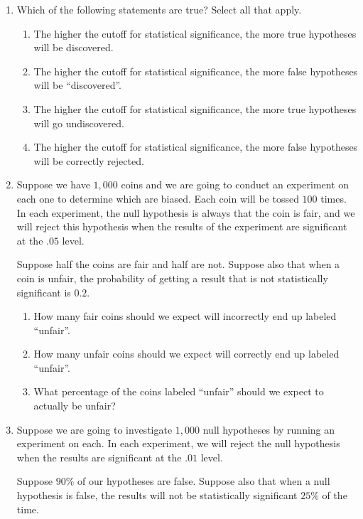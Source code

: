 \documentclass[justified]{tufte-book}
\providecommand{\tightlist}{%
  \setlength{\itemsep}{0pt}\setlength{\parskip}{0pt}}
\theoremstyle{definition}
\theoremstyle{definition}
\theoremstyle{definition}
\theoremstyle{remark}
\begin{document}
\begin{enumerate}
\item
  Which of the following statements are true? Select all that apply.

  \begin{enumerate}
  \def\labelenumii{\alph{enumii}.}
  \tightlist
  \item
    The higher the cutoff for statistical significance, the more true hypotheses will be discovered.
  \item
    The higher the cutoff for statistical significance, the more false hypotheses will be ``discovered''.
  \item
    The higher the cutoff for statistical significance, the more true hypotheses will go undiscovered.
  \item
    The higher the cutoff for statistical significance, the more false hypotheses will be correctly rejected.
  \end{enumerate}
\item
  Suppose we have \(1,000\) coins and we are going to conduct an experiment on each one to determine which are biased. Each coin will be tossed \(100\) times. In each experiment, the null hypothesis is always that the coin is fair, and we will reject this hypothesis when the results of the experiment are significant at the \(.05\) level.

  Suppose half the coins are fair and half are not. Suppose also that when a coin is unfair, the probability of getting a result that is not statistically significant is \(0.2\).

  \begin{enumerate}
  \def\labelenumii{\alph{enumii}.}
  \tightlist
  \item
    How many fair coins should we expect will incorrectly end up labeled ``unfair''.
  \item
    How many unfair coins should we expect will correctly end up labeled ``unfair''.
  \item
    What percentage of the coins labeled ``unfair'' should we expect to actually be unfair?
  \end{enumerate}
\item
  Suppose we are going to investigate \(1,000\) null hypotheses by running an experiment on each. In each experiment, we will reject the null hypothesis when the results are significant at the \(.01\) level.

  Suppose \(90\%\) of our hypotheses are false. Suppose also that when a null hypothesis is false, the results will not be statistically significant \(25\%\) of the time.


\end{enumerate}
\end{document}
